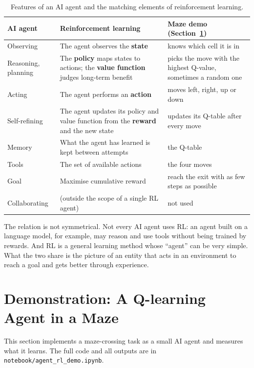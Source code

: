 \documentclass[11pt, a4paper]{article}
\newcommand{\code}[1]{\texttt{#1}}
\begin{document}
\begin{table}[H]
\centering
\small
\caption{Features of an AI agent and the matching elements of reinforcement learning.}
\label{tab:mapping}
\begin{tabularx}{\textwidth}{l X X}
\toprule
AI agent & Reinforcement learning & Maze demo (Section~\ref{sec:demo}) \\
\midrule
Observing & The agent observes the \textbf{state} & knows which cell it is in \\
Reasoning, planning & The \textbf{policy} maps states to actions; the \textbf{value function} judges long-term benefit & picks the move with the highest Q-value, sometimes a random one \\
Acting & The agent performs an \textbf{action} & moves left, right, up or down \\
Self-refining & The agent updates its policy and value function from the \textbf{reward} and the new state & updates its Q-table after every move \\
Memory & What the agent has learned is kept between attempts & the Q-table \\
Tools & The set of available actions & the four moves \\
Goal & Maximise cumulative reward & reach the exit with as few steps as possible \\
Collaborating & (outside the scope of a single RL agent) & not used \\
\bottomrule
\end{tabularx}
\end{table}

The relation is not symmetrical. Not every AI agent uses RL: an agent built on a language model, for example, may reason and use tools without being trained by rewards. And RL is a general learning method whose ``agent'' can be very simple. What the two share is the picture of an entity that acts in an environment to reach a goal and gets better through experience.

\section{Demonstration: A Q-learning Agent in a Maze}
\label{sec:demo}

This section implements a maze-crossing task as a small AI agent and measures what it learns. The full code and all outputs are in \code{notebook/agent\_rl\_demo.ipynb}.
\end{document}
